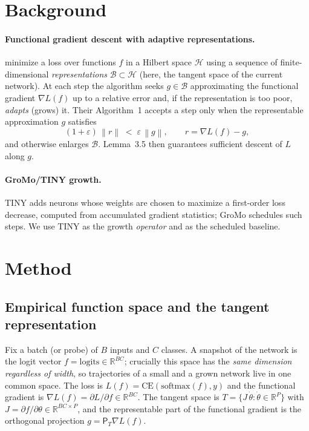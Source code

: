 \documentclass{article}
\newcommand{\R}{\mathbb{R}}
\newcommand{\norm}[1]{\left\lVert #1 \right\rVert}
\newcommand{\grad}{\nabla}
\newcommand{\PT}{\mathsf{P}_{T}}
\newcommand{\eps}{\varepsilon}
\begin{document}
\section{Background}
\paragraph{Functional gradient descent with adaptive representations.}
\citet{fgd2025} minimize a loss over functions $f$ in a Hilbert space
$\mathcal{H}$ using a sequence of finite-dimensional \emph{representations}
$\mathcal{B}\subset\mathcal{H}$ (here, the tangent space of the current network).
At each step the algorithm seeks $g\in\mathcal{B}$ approximating the functional
gradient $\grad L(f)$ up to a relative error and, if the representation is too
poor, \emph{adapts} (grows) it. Their Algorithm~1 accepts a step only when the
representable approximation $g$ satisfies
\begin{equation}\label{eq:cert}
  (1+\eps)\,\norm{r} \;<\; \eps\,\norm{g}, \qquad r=\grad L(f)-g,
\end{equation}
and otherwise enlarges $\mathcal{B}$. Lemma~3.5 then guarantees sufficient descent
of $L$ along $g$.

\paragraph{GroMo/TINY growth.} TINY adds neurons whose weights are chosen to
maximize a first-order loss decrease, computed from accumulated gradient
statistics; GroMo schedules such steps. We use TINY as the growth \emph{operator}
and as the scheduled baseline.

\section{Method}\label{sec:method}
\subsection{Empirical function space and the tangent representation}
Fix a batch (or probe) of $B$ inputs and $C$ classes. A snapshot of the network
is the logit vector $f=\mathrm{logits}\in\R^{B C}$; crucially this space has the
\emph{same dimension regardless of width}, so trajectories of a small and a grown
network live in one common space. The loss is $L(f)=\mathrm{CE}(\mathrm{softmax}(f),y)$
and the functional gradient is $\grad L(f)=\partial L/\partial f\in\R^{BC}$. The
tangent space is $T=\{J\,\dot\theta:\dot\theta\in\R^{P}\}$ with
$J=\partial f/\partial\theta\in\R^{BC\times P}$, and the representable part of the
functional gradient is the orthogonal projection $g=\PT\grad L(f)$.
\end{document}

